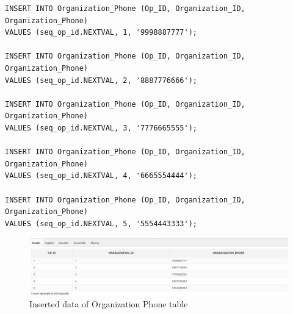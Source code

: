 \begin{lstlisting}[caption={Inserting data into Organization\_Phone tables},label={lst:insert_Organization_Phone}]
INSERT INTO Organization_Phone (Op_ID, Organization_ID, Organization_Phone)
VALUES (seq_op_id.NEXTVAL, 1, '9998887777');

INSERT INTO Organization_Phone (Op_ID, Organization_ID, Organization_Phone)
VALUES (seq_op_id.NEXTVAL, 2, '8887776666');

INSERT INTO Organization_Phone (Op_ID, Organization_ID, Organization_Phone)
VALUES (seq_op_id.NEXTVAL, 3, '7776665555');

INSERT INTO Organization_Phone (Op_ID, Organization_ID, Organization_Phone)
VALUES (seq_op_id.NEXTVAL, 4, '6665554444');

INSERT INTO Organization_Phone (Op_ID, Organization_ID, Organization_Phone)
VALUES (seq_op_id.NEXTVAL, 5, '5554443333');
\end{lstlisting}

\begin{figure}[H]
    \centering
    \includegraphics[width=1\textwidth]{images/TableData/ORGANIZATION_PHONE.png}
    \caption{Inserted data of Organization Phone table}
\end{figure}

